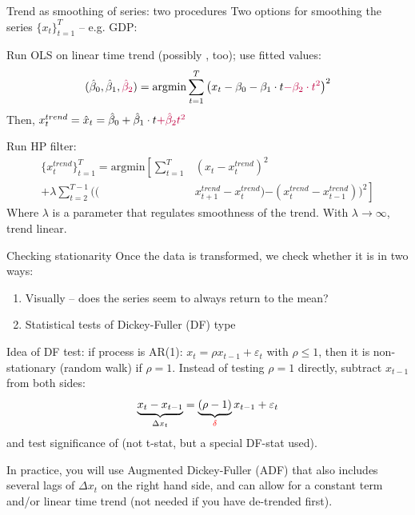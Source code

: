 \documentclass{beamer}
\newcommand{\tb}[1]{{\color{blue}{\textbf{#1}}}}
\newcommand{\trs}[1]{{\color{red}{#1}}}
\newcommand{\tps}[1]{{\color{purple}{#1}}}
\newenvironment{mynumerate}
{\vfill\enumerate[nolistsep,itemsep=\fill,label=\arabic*.]}
  {\endenumerate}
\begin{document}
\begin{frame}{Trend as smoothing of series: two procedures}
Two options for smoothing the series $\{x_t\}_{t=1}^T$ -- e.g. GDP:
\begin{mynumerate}
    \item Run OLS on linear time trend (possibly \tps{quadratic trend}, too); use fitted values: 
    $$(\hat \beta_0, \hat \beta_1, \tps{\hat \beta_2}) = \text{argmin} \sum_{t=1}^T \left(x_t -  \beta_0 - \beta_1 \cdot t \tps{-\beta_2 \cdot t^2}\right)^2$$
    Then, $x^{trend}_t = \hat x_t = \hat \beta_0 + \hat \beta_1 \cdot t \tps{+ \hat \beta_2 t^2}$
    \item Run HP filter:
    \begin{align*}
        \{x^{trend}_t\}_{t=1}^T = \text{argmin} \left[\sum_{t=1}^{T}\right. &(x_t - x^{trend}_t)^2 \\ + \lambda \sum_{t=2}^{T-1}( (&x^{trend}_{t+1} - x^{trend}_t) \left.- (x^{trend}_{t} - x^{trend}_{t-1}))^2\right]
    \end{align*}
Where $\lambda$ is a parameter that regulates smoothness of the trend. With $\lambda \to \infty$, trend linear. 
\end{mynumerate}
\end{frame}


\begin{frame}{Checking stationarity}
    Once the data is transformed, we check whether it is \tb{stationary} in two ways:
    \begin{enumerate}
        \item Visually -- does the series seem to always return to the mean?
        \item Statistical tests of Dickey-Fuller (DF) type  
    \end{enumerate}
    \vfill
    Idea of DF test: if process is AR(1): $x_t = \rho x_{t-1}+\varepsilon_t$ with $\rho \leq 1$, then it is non-stationary (random walk) if $\rho =1$. \vfill
    Instead of testing $\rho = 1$ directly, subtract $x_{t-1}$ from both sides: 
    $$\underbrace{x_t - x_{t-1}}_{\Delta x_t} = \underbrace{(\rho-1)}_{\trs{\delta}} x_{t-1} + \varepsilon_t$$
    and test significance of \trs{$\delta$} (not t-stat, but a special DF-stat used). \vfill

    In practice, you will use Augmented Dickey-Fuller (ADF) that also includes several lags of $\Delta x_t$ on the right hand side, and can allow for a constant term and/or linear time trend (not needed if you have de-trended first). 
\end{frame}
\end{document}
